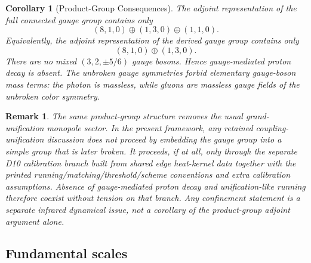 \documentclass[11pt]{article}
\newtheorem{corollary}[theorem]{Corollary}
\newtheorem{remark}[theorem]{Remark}
\begin{document}
\begin{corollary}[Product-Group Consequences]
The adjoint representation of the full connected gauge group contains only
\[
(8,1,0)\oplus(1,3,0)\oplus(1,1,0).
\]
Equivalently, the adjoint representation of the derived gauge group contains only
\[
(8,1,0)\oplus(1,3,0).
\]
There are no mixed $(3,2,\pm 5/6)$ gauge bosons. Hence gauge-mediated proton decay is absent. The unbroken gauge symmetries forbid elementary gauge-boson mass terms: the photon is massless, while gluons are massless gauge fields of the unbroken color symmetry.
\end{corollary}

\begin{remark}
The same product-group structure removes the usual grand-unification monopole sector. In the present framework, any retained coupling-unification discussion does not proceed by embedding the gauge group into a simple group that is later broken. It proceeds, if at all, only through the separate D10 calibration branch built from shared edge heat-kernel data together with the printed running/matching/threshold/scheme conventions and extra calibration assumptions. Absence of gauge-mediated proton decay and unification-like running therefore coexist without tension on that branch. Any confinement statement is a separate infrared dynamical issue, not a corollary of the product-group adjoint argument alone.
\end{remark}

\subsection{Fundamental scales}
\end{document}
